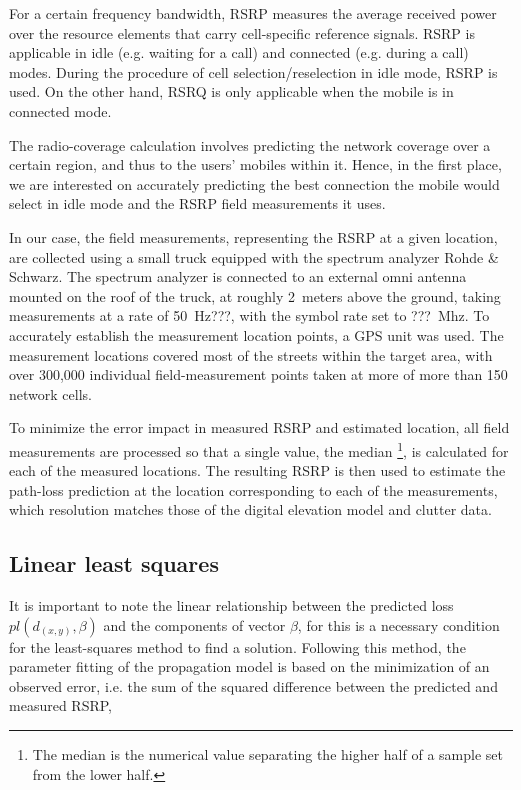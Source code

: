 For a certain frequency bandwidth, RSRP measures the average received
power over the resource elements that carry cell-specific reference
signals. RSRP is applicable in idle (e.g. waiting for a call) and
connected (e.g. during a call) modes. During the procedure of cell
selection/reselection in idle mode, RSRP is used. On the other hand,
RSRQ is only applicable when the mobile is in connected mode. 

The radio-coverage calculation involves predicting the network coverage
over a certain region, and thus to the users' mobiles within it. Hence,
in the first place, we are interested on accurately predicting the
best connection the mobile would select in idle mode and the RSRP
field measurements it uses.

In our case, the field measurements, representing the RSRP at a given
location, are collected using a small truck equipped with the spectrum
analyzer Rohde \& Schwarz. The spectrum analyzer is connected to an
external omni antenna mounted on the roof of the truck, at roughly
2~meters above the ground, taking measurements at a rate of 50~Hz???,
with the symbol rate set to ???~Mhz. To accurately establish the
measurement location points, a GPS unit was used. The measurement
locations covered most of the streets within the target area, with
over 300,000 individual field-measurement points taken at more of
more than 150 network cells.

To minimize the error impact in measured RSRP and estimated location,
all field measurements are processed so that a single value, the median%
\footnote{The median is the numerical value separating the higher half of a
sample set from the lower half.%
}, is calculated for each of the measured locations. The resulting
RSRP is then used to estimate the path-loss prediction at the location
corresponding to each of the measurements, which resolution matches
those of the digital elevation model and clutter data.


\subsection{Linear least squares}

It is important to note the linear relationship between the predicted
loss $pl(d_{(x,y)},\beta)$ and the components of vector $\beta$,
for this is a necessary condition for the least-squares method to
find a solution. Following this method, the parameter fitting of the
propagation model is based on the minimization of an observed error,
i.e. the sum of the squared difference between the predicted and measured
RSRP,

